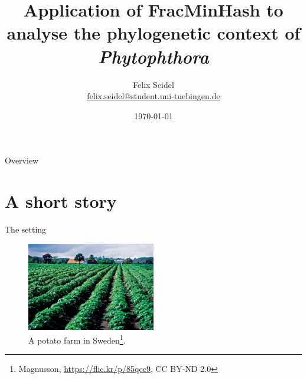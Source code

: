 \documentclass[aspectratio=169]{beamer}
\title{Application of FracMinHash to analyse the phylogenetic context of \textit{Phytophthora}}
\date{\today}
\author{ Felix Seidel \\
\href{mailto:felix.seidel@student.uni-tuebingen.de}{felix.seidel@student.uni-tuebingen.de}
}
\begin{document}
\maketitle

\begin{frame}{Overview}
    \tableofcontents
\end{frame}

\section{A short story}
\begin{frame}{The setting}
    \begin{figure}
        \centering
        \includegraphics[width=0.5\textwidth]{figures/potato_farm.jpg}
        \caption{A potato farm in Sweden\footnote{Magnusson, \url{https://flic.kr/p/85qcc9}, CC BY-ND 2.0}.}
        \label{fig:farm}
    \end{figure}
\end{frame}
\end{document}
